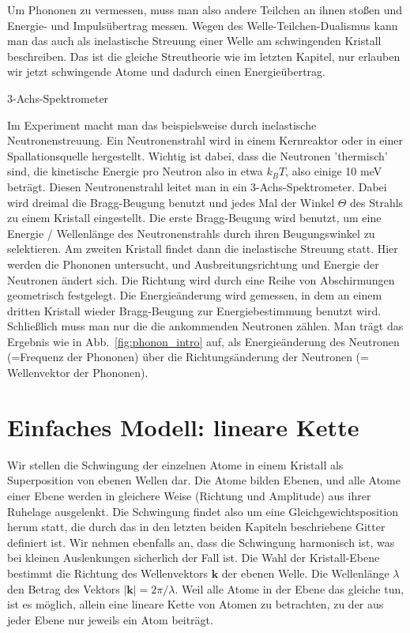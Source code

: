 Um Phononen zu vermessen, muss man also andere Teilchen an ihnen stoßen und Energie- und Impulsübertrag messen. Wegen des Welle-Teilchen-Dualismus kann man das auch als inelastische Streuung einer Welle am schwingenden Kristall beschreiben. Das ist die gleiche Streutheorie wie im letzten Kapitel, nur erlauben wir jetzt schwingende Atome und dadurch einen Energieübertrag.

\begin{marginfigure}
\caption{3-Achs-Spektrometer}

\end{marginfigure}

Im Experiment macht man das beispielsweise durch inelastische Neutronenstreuung. Ein Neutronenstrahl wird in einem Kernreaktor oder in einer Spallationsquelle  hergestellt. Wichtig ist dabei, dass die Neutronen 'thermisch' sind, die kinetische Energie pro  Neutron also in etwa $k_B T$, also einige 10 meV beträgt. Diesen Neutronenstrahl leitet man in ein 3-Achs-Spektrometer. Dabei wird dreimal die Bragg-Beugung benutzt und jedes Mal der Winkel $\Theta$ des Strahls zu einem Kristall eingestellt. Die erste Bragg-Beugung wird benutzt, um eine Energie / Wellenlänge des Neutronenstrahls durch ihren Beugungswinkel zu selektieren. Am zweiten Kristall findet dann die inelastische Streuung statt. Hier werden die Phononen untersucht, und Ausbreitungsrichtung und Energie der Neutronen ändert sich. Die Richtung wird durch eine Reihe von Abschirmungen geometrisch festgelegt. Die Energieänderung wird gemessen, in dem an einem dritten Kristall wieder Bragg-Beugung zur Energiebestimmung benutzt wird. Schließlich muss man nur die die ankommenden Neutronen zählen. Man trägt das Ergebnis wie in Abb.~\ref{fig:phonon_intro} auf, als Energieänderung des Neutronen (=Frequenz der Phononen) über die Richtungsänderung der Neutronen (= Wellenvektor der Phononen).

\section{Einfaches Modell: lineare Kette}

Wir stellen die Schwingung der einzelnen Atome in einem Kristall als Superposition von ebenen Wellen dar. Die Atome bilden Ebenen, und alle Atome einer Ebene werden in gleichere Weise (Richtung und Amplitude) aus ihrer Ruhelage ausgelenkt. Die Schwingung findet also um eine Gleichgewichtsposition herum statt, die durch das in den letzten beiden Kapiteln beschriebene Gitter definiert ist. Wir nehmen ebenfalls an, dass die Schwingung harmonisch ist, was bei kleinen Auslenkungen sicherlich der Fall ist. Die Wahl der Kristall-Ebene bestimmt die Richtung des Wellenvektors $\mathbf{k}$ der ebenen Welle. Die Wellenlänge $\lambda$ den Betrag des Vektors $|\mathbf{k}| = 2 \pi / \lambda$. Weil alle Atome in der Ebene das gleiche tun, ist es möglich, allein eine lineare Kette von Atomen zu betrachten, zu der aus jeder Ebene nur jeweils ein Atom beiträgt.

